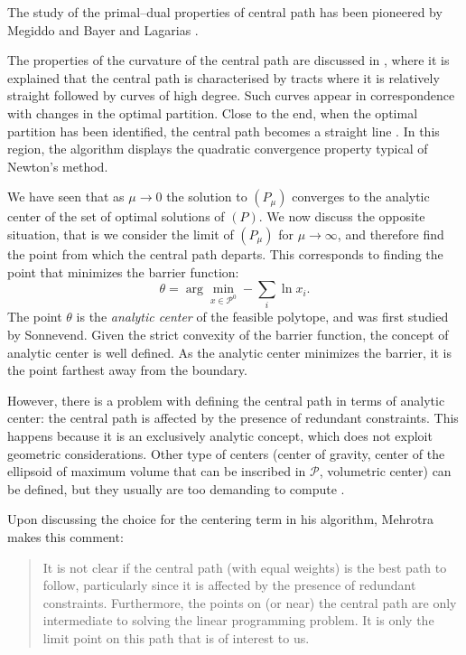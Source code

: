 The study of the primal--dual properties of central path has been pioneered by
Megiddo \cite{Megiddo} and Bayer and Lagarias \cite{BayerLagarias}.

The properties of the curvature of the central path are discussed
in \cite{VavasisYe}, where it is explained that the central path
is characterised by tracts where it is relatively straight
followed by curves of high degree. 
Such curves appear in correspondence with changes in the optimal
partition.
Close to the end, when the optimal partition has been identified,
the central path becomes a straight line \cite{Megiddo}.
In this region, the algorithm displays the quadratic convergence 
property typical of Newton's method.

We have seen that as $\mu \to 0$ the solution to $(P_\mu)$ 
converges to the analytic center of the set of optimal solutions of $(P)$.
We now discuss the opposite situation, that is we consider
the limit of $(P_\mu)$ for $\mu \to \infty$, and therefore
find the point from which the central path departs.
This corresponds to finding the point that minimizes the barrier function:
\[
\theta = \arg \min_{x \in \mathcal{P}^0} -\sum_i \ln x_i.
\]
The point $\theta$ is the {\em analytic center} of the feasible polytope, 
and was first studied by Sonnevend.
Given the strict convexity of the barrier function, the concept 
of analytic center is well defined.
As the analytic center minimizes the barrier, it
is the point farthest away from the boundary.

However, there is a problem with defining the central path in terms
of analytic center: the central path is affected by the presence of 
redundant constraints. 
This happens because it is an exclusively analytic concept, which does
not exploit geometric considerations.
Other type of centers (center of gravity, center of the ellipsoid of 
maximum volume that can be inscribed in $\mathcal{P}$, volumetric center) 
can be defined, but they usually are too demanding to compute 
\cite{Gonzaga92}. 



Upon discussing the choice for the centering term in his algorithm,
Mehrotra \cite{Mehrotra92} makes this comment:
\begin{quote}
It is not clear if the central path (with
equal weights) is the best path to follow, particularly since it
is affected by the presence of redundant constraints. Furthermore,
the points on (or near) the central path are only intermediate to
solving the linear programming problem. It is only the limit point 
on this path that is of interest to us.
\end{quote}

